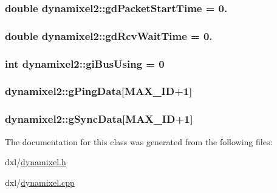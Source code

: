 \subsubsection[{gd\+Packet\+Start\+Time}]{\setlength{\rightskip}{0pt plus 5cm}double dynamixel2\+::gd\+Packet\+Start\+Time = 0.\hspace{0.3cm}{\ttfamily [private]}}\label{classdynamixel2_ac9746f2c7ed6d706152d6d0d502993c0}
\hypertarget{classdynamixel2_ae7b830369861e191120f9b310a68e2d8}{}
\subsubsection[{gd\+Rcv\+Wait\+Time}]{\setlength{\rightskip}{0pt plus 5cm}double dynamixel2\+::gd\+Rcv\+Wait\+Time = 0.\hspace{0.3cm}{\ttfamily [private]}}\label{classdynamixel2_ae7b830369861e191120f9b310a68e2d8}
\hypertarget{classdynamixel2_a7fc43b4c4b7e36aa8f0420b037658f83}{}
\subsubsection[{gi\+Bus\+Using}]{\setlength{\rightskip}{0pt plus 5cm}int dynamixel2\+::gi\+Bus\+Using = 0\hspace{0.3cm}{\ttfamily [private]}}\label{classdynamixel2_a7fc43b4c4b7e36aa8f0420b037658f83}
\hypertarget{classdynamixel2_ae5cf4b09150f4a480ee23279c4e97486}{}
\subsubsection[{g\+Ping\+Data}]{ dynamixel2\+::g\+Ping\+Data\mbox{[}{\bf M\+A\+X\+\_\+\+I\+D}+1\mbox{]}\hspace{0.3cm}{\ttfamily [private]}}\label{classdynamixel2_ae5cf4b09150f4a480ee23279c4e97486}
\hypertarget{classdynamixel2_a5923ec2418ab7ea83cbe365ad8b200d5}{}
\subsubsection[{g\+Sync\+Data}]{ dynamixel2\+::g\+Sync\+Data\mbox{[}{\bf M\+A\+X\+\_\+\+I\+D}+1\mbox{]}\hspace{0.3cm}{\ttfamily [private]}}\label{classdynamixel2_a5923ec2418ab7ea83cbe365ad8b200d5}


The documentation for this class was generated from the following files\+:\begin{DoxyCompactItemize}
\item 
dxl/\hyperlink{dynamixel_8h}{dynamixel.\+h}\item 
dxl/\hyperlink{dynamixel_8cpp}{dynamixel.\+cpp}\end{DoxyCompactItemize}
